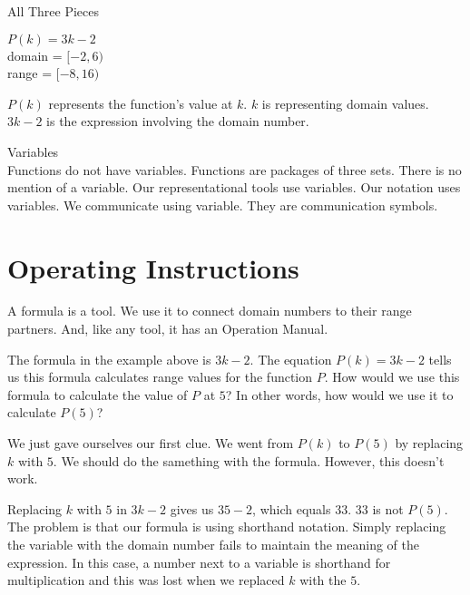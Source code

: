 \documentclass{ximera}
\begin{document}
\begin{example}   All Three Pieces 

$P(k) = 3k - 2$ \\
domain = $[-2, 6)$ \\
range = $[-8, 16)$


$P(k)$ represents the function's value at $k$.  $k$ is representing domain values. $3k - 2$ is the expression involving the domain number.

\end{example}




\begin{warning} Variables \\

Functions do not have variables.  Functions are packages of three sets.  There is no mention of a variable. Our representational tools use variables. Our notation uses variables. We communicate using variable.  They are communication symbols. 

\end{warning}






\section{Operating Instructions}

A formula is a tool.  We use it to connect domain numbers to their range partners.  And, like any tool, it has an Operation Manual.



The formula in the example above is $3k - 2$.  The equation $P(k) = 3k - 2$ tells us this formula calculates range values for the function $P$.  How would we use this formula to calculate the value of $P$ at $5$?   In other words, how would we use it to calculate $P(5)$?

We just gave ourselves our first clue. We went from $P(k)$ to $P(5)$ by replacing $k$ with $5$.  We should do the samething with the formula. However, this doesn't work.






Replacing $k$ with $5$ in $3k - 2$ gives us $35-2$, which equals $33$.  $33$ is not $P(5)$. The problem is that our formula is using shorthand notation. Simply replacing the variable with the domain number fails to maintain the meaning of the expression.  In this case, a number next to a variable is shorthand for multiplication and this was lost when we replaced $k$ with the $5$.
\end{document}
